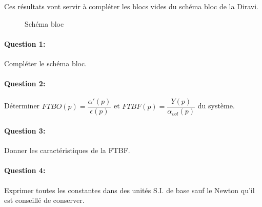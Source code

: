 Ces résultats vont servir à compléter les blocs vides du schéma bloc de la Diravi.

\begin{figure}[!h]
\begin{center}
\end{center}
 \caption{Schéma bloc}
 \label{blocs1}
\end{figure}

\paragraph{Question 1:} Compléter le schéma bloc.

\paragraph{Question 2:} Déterminer $FTBO(p)=\dfrac{\alpha'(p)}{\epsilon(p)}$ et $FTBF(p)=\dfrac{Y(p)}{\alpha_{vol}(p)}$ du système.

\paragraph{Question 3:} Donner les caractéristiques de la FTBF.

\paragraph{Question 4:} Exprimer toutes les constantes dans des unités S.I. de base sauf le Newton qu'il est conseillé de conserver.

